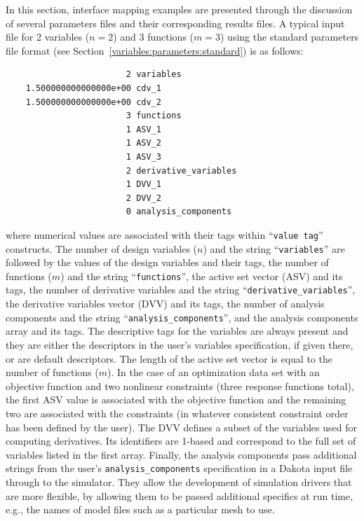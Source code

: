 In this section, interface mapping examples are presented through the
discussion of several parameters files and their corresponding results
files. A typical input file for 2 variables ($n=2$) and 3 functions
($m=3$) using the standard parameters file format (see
Section~\ref{variables:parameters:standard}) is as follows:
\begin{small}
\begin{verbatim}
                        2 variables
    1.500000000000000e+00 cdv_1
    1.500000000000000e+00 cdv_2
                        3 functions
                        1 ASV_1
                        1 ASV_2
                        1 ASV_3
                        2 derivative_variables
                        1 DVV_1
                        2 DVV_2
                        0 analysis_components
\end{verbatim}
\end{small}
where numerical values are associated with their tags within
``\texttt{value tag}'' constructs. The number of design variables
($n$) and the string ``\texttt{variables}'' are followed by the values
of the design variables and their tags, the number of functions ($m$)
and the string ``\texttt{functions}'', the active set vector (ASV) and
its tags, the number of derivative variables and the string
``\texttt{derivative\_variables}'', the derivative variables vector
(DVV) and its tags, the number of analysis components and the string
``\texttt{analysis\_components}'', and the analysis components array
and its tags.  The descriptive tags for the variables are always
present and they are either the descriptors in the user's variables
specification, if given there, or are default descriptors.  The length
of the active set vector is equal to the number
of functions ($m$). In the case of an optimization data set with an
objective function and two nonlinear constraints (three response
functions total), the first ASV value is associated with the objective
function and the remaining two are associated with the constraints (in
whatever consistent constraint order has been defined by the user).
The DVV defines a subset of the variables used for computing
derivatives.  Its identifiers are 1-based and correspond to the full
set of variables listed in the first array.  Finally, the analysis
components pass additional strings from the user's
\texttt{analysis\_components} specification in a Dakota input file
through to the simulator.  They allow the development of simulation
drivers that are more flexible, by allowing them to be passed
additional specifics at run time, e.g., the names of model files such
as a particular mesh to use.

